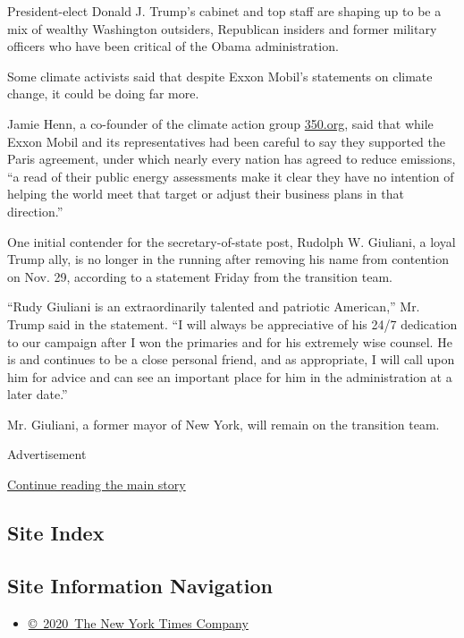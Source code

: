 President-elect Donald J. Trump's cabinet and top staff are shaping up
to be a mix of wealthy Washington outsiders, Republican insiders and
former military officers who have been critical of the Obama
administration.

Some climate activists said that despite Exxon Mobil's statements on
climate change, it could be doing far more.

Jamie Henn, a co-founder of the climate action group
\href{http://350.org/}{350.org}, said that while Exxon Mobil and its
representatives had been careful to say they supported the Paris
agreement, under which nearly every nation has agreed to reduce
emissions, ``a read of their public energy assessments make it clear
they have no intention of helping the world meet that target or adjust
their business plans in that direction.''

One initial contender for the secretary-of-state post, Rudolph W.
Giuliani, a loyal Trump ally, is no longer in the running after removing
his name from contention on Nov. 29, according to a statement Friday
from the transition team.

``Rudy Giuliani is an extraordinarily talented and patriotic American,''
Mr. Trump said in the statement. ``I will always be appreciative of his
24/7 dedication to our campaign after I won the primaries and for his
extremely wise counsel. He is and continues to be a close personal
friend, and as appropriate, I will call upon him for advice and can see
an important place for him in the administration at a later date.''

Mr. Giuliani, a former mayor of New York, will remain on the transition
team.

Advertisement

\protect\hyperlink{after-bottom}{Continue reading the main story}

\hypertarget{site-index}{%
\subsection{Site Index}\label{site-index}}

\hypertarget{site-information-navigation}{%
\subsection{Site Information
Navigation}\label{site-information-navigation}}

\begin{itemize}
\tightlist
\item
  \href{https://help.nytimes3xbfgragh.onion/hc/en-us/articles/115014792127-Copyright-notice}{©~2020~The
  New York Times Company}
\end{itemize}

